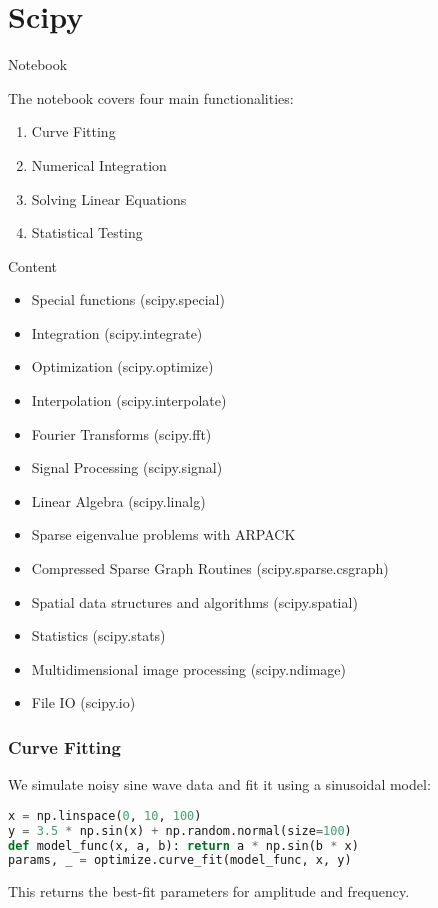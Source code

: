\section{Scipy}

\begin{frame}[plain]
\sectionpage
\end{frame}


\begin{frame}{Notebook}

The notebook covers four main functionalities:
\begin{enumerate}
    \item Curve Fitting
    \item Numerical Integration
    \item Solving Linear Equations
    \item Statistical Testing
\end{enumerate}
\end{frame}

\begin{frame}[allowframebreaks]{Content}
\begin{itemize}
\item Special functions (scipy.special)
\item  Integration (scipy.integrate)
\item Optimization (scipy.optimize)
\item Interpolation (scipy.interpolate)
\item Fourier Transforms (scipy.fft)
\item Signal Processing (scipy.signal)
\item Linear Algebra (scipy.linalg)
\item Sparse eigenvalue problems with ARPACK
\item Compressed Sparse Graph Routines (scipy.sparse.csgraph)
\item Spatial data structures and algorithms (scipy.spatial)
\item Statistics (scipy.stats)
\item Multidimensional image processing (scipy.ndimage)
\item File IO (scipy.io)
\end{itemize}
\end{frame}



\begin{frame}[fragile]
\frametitle{Curve Fitting}
We simulate noisy sine wave data and fit it using a sinusoidal model:

\begin{lstlisting}[language=python]
x = np.linspace(0, 10, 100)
y = 3.5 * np.sin(x) + np.random.normal(size=100)
def model_func(x, a, b): return a * np.sin(b * x)
params, _ = optimize.curve_fit(model_func, x, y)
\end{lstlisting}


This returns the best-fit parameters for amplitude and frequency.
\end{frame}


